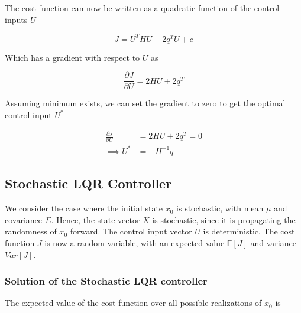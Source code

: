 \documentclass{article}
\begin{document}
The cost function can now be written as a quadratic function of the control inputs $U$

$$
J = U^T H U + 2 q^T U + c
$$

Which has a gradient with respect to $U$ as

$$
\frac{\partial J}{\partial U} = 2 H U + 2 q^T
$$

Assuming minimum exists, we can set the gradient to zero to get the optimal control input $U^*$

\begin{equation}
  \begin{aligned}
    \frac{\partial J}{\partial U} &= 2 H U + 2 q^T = 0 \\
    \implies U^* &= -H^{-1} q
  \end{aligned}
\end{equation}

\subsection{Stochastic LQR Controller} \label{stochastic_lqr}

We consider the case where the initial state $x_0$ is stochastic, with mean $\mu$ and covariance $\Sigma$.
Hence, the state vector $X$ is stochastic, since it is propagating the randomness of $x_0$ forward.
The control input vector $U$ is deterministic. The cost function $J$ is now a random variable,
with an expected value $\mathbb{E}[J]$ and variance $Var[J]$.

\subsubsection{Solution of the Stochastic LQR controller}

The expected value of the cost function over all possible realizations of $x_0$ is
\end{document}
